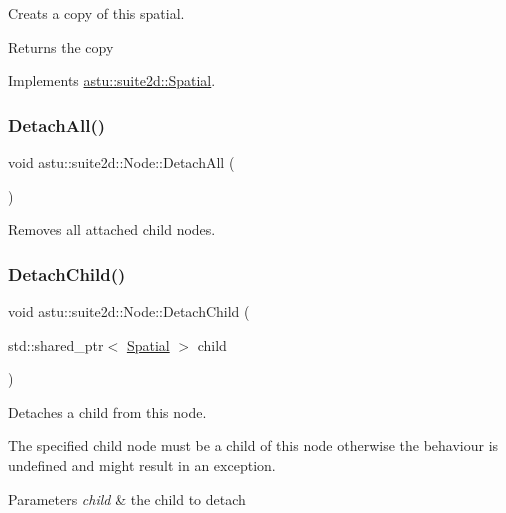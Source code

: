 Creats a copy of this spatial.

\begin{DoxyReturn}{Returns}
the copy 
\end{DoxyReturn}


Implements \hyperlink{classastu_1_1suite2d_1_1Spatial_a5c058079c94b0e8d7590e70ca2159bd1}{astu\+::suite2d\+::\+Spatial}.

\mbox{\label{classastu_1_1suite2d_1_1Node_ade5f4ec860f962e34baaf79e50a01a66}} 
\subsubsection{\texorpdfstring{Detach\+All()}{DetachAll()}}
{\footnotesize\ttfamily void astu\+::suite2d\+::\+Node\+::\+Detach\+All (\begin{DoxyParamCaption}{ }\end{DoxyParamCaption})}

Removes all attached child nodes. \mbox{\label{classastu_1_1suite2d_1_1Node_ae6977abb31222cdba974bd683164cc0b}} 
\subsubsection{\texorpdfstring{Detach\+Child()}{DetachChild()}\hspace{0.1cm}{\footnotesize\ttfamily [1/2]}}
{\footnotesize\ttfamily void astu\+::suite2d\+::\+Node\+::\+Detach\+Child (\begin{DoxyParamCaption}\item[{std\+::shared\+\_\+ptr$<$ \hyperlink{classastu_1_1suite2d_1_1Spatial}{Spatial} $>$}]{child }\end{DoxyParamCaption})}

Detaches a child from this node.

The specified child node must be a child of this node otherwise the behaviour is undefined and might result in an exception.


\begin{DoxyParams}{Parameters}
{\em child} & the child to detach \\
\hline
\end{DoxyParams}
\mbox{\label{classastu_1_1suite2d_1_1Node_a72d49c18000140f747dbc22b8972084b}} 
